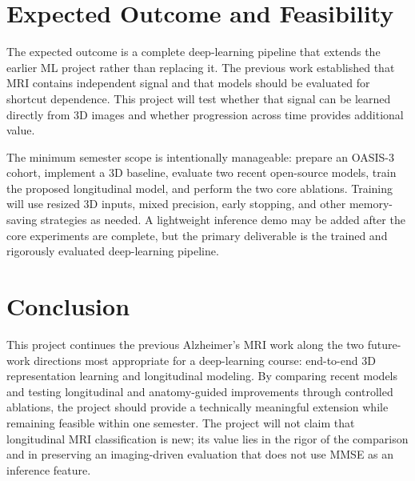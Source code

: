 \documentclass[11pt]{article}
\begin{document}
\section{Expected Outcome and Feasibility}

The expected outcome is a complete deep-learning pipeline that extends the earlier ML project rather than replacing it. The previous work established that MRI contains independent signal and that models should be evaluated for shortcut dependence. This project will test whether that signal can be learned directly from 3D images and whether progression across time provides additional value.

The minimum semester scope is intentionally manageable: prepare an OASIS-3 cohort, implement a 3D baseline, evaluate two recent open-source models, train the proposed longitudinal model, and perform the two core ablations. Training will use resized 3D inputs, mixed precision, early stopping, and other memory-saving strategies as needed. A lightweight inference demo may be added after the core experiments are complete, but the primary deliverable is the trained and rigorously evaluated deep-learning pipeline.

\section{Conclusion}

This project continues the previous Alzheimer's MRI work along the two future-work directions most appropriate for a deep-learning course: end-to-end 3D representation learning and longitudinal modeling. By comparing recent models and testing longitudinal and anatomy-guided improvements through controlled ablations, the project should provide a technically meaningful extension while remaining feasible within one semester. The project will not claim that longitudinal MRI classification is new; its value lies in the rigor of the comparison and in preserving an imaging-driven evaluation that does not use MMSE as an inference feature.
\end{document}
